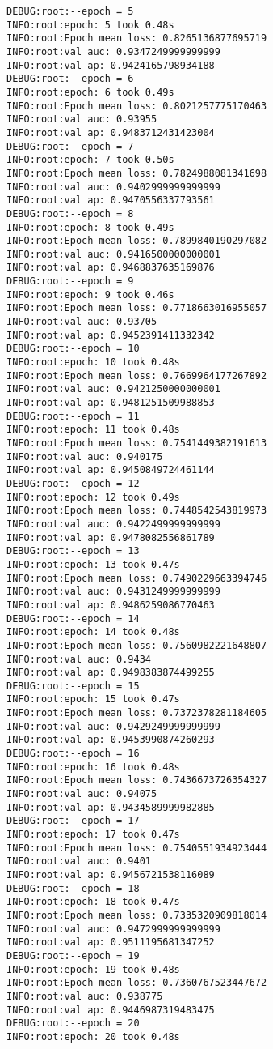 \documentclass[11pt]{article}
\begin{document}
\begin{verbatim}
DEBUG:root:--epoch = 5
INFO:root:epoch: 5 took 0.48s
INFO:root:Epoch mean loss: 0.8265136877695719
INFO:root:val auc: 0.9347249999999999
INFO:root:val ap: 0.9424165798934188
DEBUG:root:--epoch = 6
INFO:root:epoch: 6 took 0.49s
INFO:root:Epoch mean loss: 0.8021257775170463
INFO:root:val auc: 0.93955
INFO:root:val ap: 0.9483712431423004
DEBUG:root:--epoch = 7
INFO:root:epoch: 7 took 0.50s
INFO:root:Epoch mean loss: 0.7824988081341698
INFO:root:val auc: 0.9402999999999999
INFO:root:val ap: 0.9470556337793561
DEBUG:root:--epoch = 8
INFO:root:epoch: 8 took 0.49s
INFO:root:Epoch mean loss: 0.7899840190297082
INFO:root:val auc: 0.9416500000000001
INFO:root:val ap: 0.9468837635169876
DEBUG:root:--epoch = 9
INFO:root:epoch: 9 took 0.46s
INFO:root:Epoch mean loss: 0.7718663016955057
INFO:root:val auc: 0.93705
INFO:root:val ap: 0.9452391411332342
DEBUG:root:--epoch = 10
INFO:root:epoch: 10 took 0.48s
INFO:root:Epoch mean loss: 0.7669964177267892
INFO:root:val auc: 0.9421250000000001
INFO:root:val ap: 0.9481251509988853
DEBUG:root:--epoch = 11
INFO:root:epoch: 11 took 0.48s
INFO:root:Epoch mean loss: 0.7541449382191613
INFO:root:val auc: 0.940175
INFO:root:val ap: 0.9450849724461144
DEBUG:root:--epoch = 12
INFO:root:epoch: 12 took 0.49s
INFO:root:Epoch mean loss: 0.7448542543819973
INFO:root:val auc: 0.9422499999999999
INFO:root:val ap: 0.9478082556861789
DEBUG:root:--epoch = 13
INFO:root:epoch: 13 took 0.47s
INFO:root:Epoch mean loss: 0.7490229663394746
INFO:root:val auc: 0.9431249999999999
INFO:root:val ap: 0.9486259086770463
DEBUG:root:--epoch = 14
INFO:root:epoch: 14 took 0.48s
INFO:root:Epoch mean loss: 0.7560982221648807
INFO:root:val auc: 0.9434
INFO:root:val ap: 0.9498383874499255
DEBUG:root:--epoch = 15
INFO:root:epoch: 15 took 0.47s
INFO:root:Epoch mean loss: 0.7372378281184605
INFO:root:val auc: 0.9429249999999999
INFO:root:val ap: 0.9453990874260293
DEBUG:root:--epoch = 16
INFO:root:epoch: 16 took 0.48s
INFO:root:Epoch mean loss: 0.7436673726354327
INFO:root:val auc: 0.94075
INFO:root:val ap: 0.9434589999982885
DEBUG:root:--epoch = 17
INFO:root:epoch: 17 took 0.47s
INFO:root:Epoch mean loss: 0.7540551934923444
INFO:root:val auc: 0.9401
INFO:root:val ap: 0.9456721538116089
DEBUG:root:--epoch = 18
INFO:root:epoch: 18 took 0.47s
INFO:root:Epoch mean loss: 0.7335320909818014
INFO:root:val auc: 0.9472999999999999
INFO:root:val ap: 0.9511195681347252
DEBUG:root:--epoch = 19
INFO:root:epoch: 19 took 0.48s
INFO:root:Epoch mean loss: 0.7360767523447672
INFO:root:val auc: 0.938775
INFO:root:val ap: 0.9446987319483475
DEBUG:root:--epoch = 20
INFO:root:epoch: 20 took 0.48s

\end{verbatim}
\end{document}
